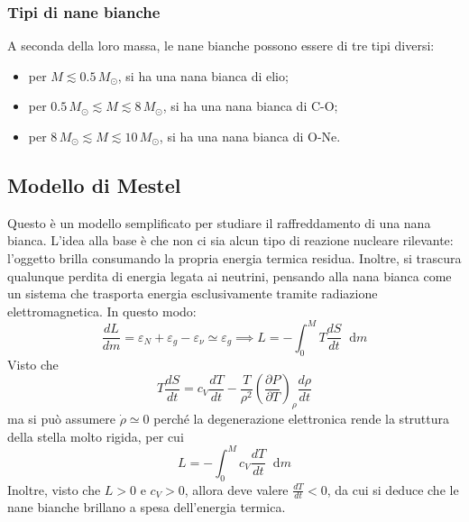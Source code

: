 \documentclass[11pt, a4paper]{scrartcl}
\theoremstyle{style}
\theoremstyle{style1}
\newcommand{\dd}{\mathop{}\!\mathrm{d}}
\numberwithin{equation}{subsection}
\begin{document}
\subsubsection{Tipi di nane bianche}
A seconda della loro massa, le nane bianche possono essere di tre tipi diversi:
\begin{itemize}
	\item per $M \lesssim 0.5\, M_\odot $, si ha una nana bianca di elio;
	\item per $0.5\, M_\odot \lesssim M \lesssim 8\, M_\odot $, si ha una nana bianca di C-O;
	\item per $8\, M_\odot \lesssim M \lesssim 10\, M_\odot $, si ha una nana bianca di O-Ne.
\end{itemize}
\subsection{Modello di Mestel}
Questo \`e un modello semplificato per studiare il raffreddamento di una nana bianca.
L'idea alla base \`e che non ci sia alcun tipo di reazione nucleare rilevante: l'oggetto brilla consumando la propria energia termica residua. 
Inoltre, si trascura qualunque perdita di energia legata ai neutrini, pensando alla nana bianca come un sistema che trasporta energia esclusivamente tramite radiazione elettromagnetica.
In questo modo:
\[
\frac{d L}{d m} = \varepsilon _N + \varepsilon _g - \varepsilon _\nu \simeq \varepsilon _g \implies L = - \int _0^M T \frac{d S}{d t} \dd m
\] 
Visto che 
\[
T \frac{d S}{d t}  = c_V \frac{d T}{d t}  - \frac{T}{\rho ^2} \left(\frac{\partial P}{\partial T} \right) _\rho  \frac{d \rho }{d t} 
\] 
ma si pu\`o assumere $\dot{\rho } \simeq 0$ perch\'e la degenerazione elettronica rende la struttura della stella molto rigida, per cui
\[
L = - \int _0^M c_V \frac{d T}{d t}  \dd m 
\] 
Inoltre, visto che $L > 0$ e $c_V > 0$, allora deve valere $\frac{d T}{d t}  < 0$, da cui si deduce che le nane bianche brillano a spesa dell'energia termica.
\end{document}
